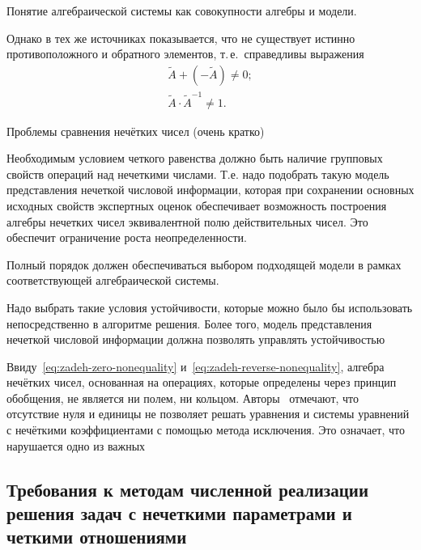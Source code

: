 

Понятие алгебраической системы как совокупности алгебры и модели.

Однако в тех же источниках показывается, что не существует истинно противоположного и обратного элементов, т.\,е.~справедливы выражения
\begin{gather}
	\label{eq:zadeh-zero-nonequality}
	\tilde{A}+\left( -\tilde{A} \right)\ne 0; \\
	\label{eq:zadeh-reverse-nonequality}
	\tilde{A}\cdot {{\tilde{A}}^{-1}}\ne 1.
\end{gather}

Проблемы сравнения нечётких чисел (очень кратко)

 
Необходимым условием четкого равенства должно быть наличие групповых свойств операций над нечеткими числами. Т.е. надо подобрать такую модель представления нечеткой числовой информации, которая при сохранении основных исходных свойств экспертных оценок обеспечивает возможность построения алгебры нечетких чисел эквивалентной  полю действительных чисел. Это обеспечит ограничение роста неопределенности.

Полный порядок должен обеспечиваться выбором подходящей модели в рамках соответствующей алгебраической системы.

Надо выбрать такие условия устойчивости, которые можно было бы использовать непосредственно в алгоритме решения. Более того, модель представления нечеткой числовой информации должна позволять управлять устойчивостью

Ввиду~\eqref{eq:zadeh-zero-nonequality} и~\eqref{eq:zadeh-reverse-nonequality}, алгебра нечётких чисел, основанная на операциях, которые определены через принцип обобщения, не является ни полем, ни кольцом. Авторы~\cite{Rutkovskaya} отмечают, что отсутствие нуля и единицы не позволяет решать уравнения и системы уравнений с нечёткими коэффициентами с помощью метода исключения. Это означает, что нарушается одно из важных


\subsection{Требования к методам численной реализации решения задач с нечеткими параметрами и четкими отношениями}

